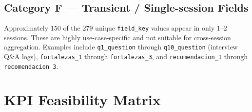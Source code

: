 \documentclass[12pt,a4paper]{article}
\begin{document}
\subsection{Category F --- Transient / Single-session Fields}

Approximately 150 of the 279 unique \texttt{field\_key} values appear in only
1--2 sessions.  These are highly use-case-specific and not suitable for
cross-session aggregation.  Examples include \texttt{q1\_question} through
\texttt{q10\_question} (interview Q\&A logs), \texttt{fortalezas\_1} through
\texttt{fortalezas\_3}, and \texttt{recomendacion\_1} through
\texttt{recomendacion\_3}.

\section{KPI Feasibility Matrix}
\end{document}
